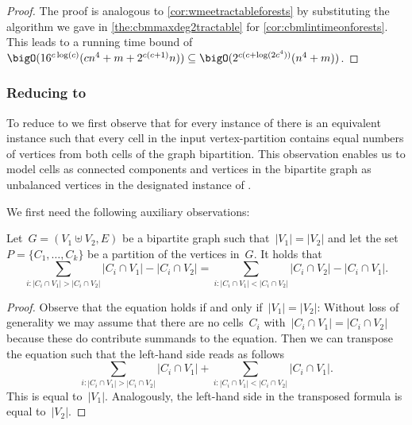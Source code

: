 \begin{proof}
  The proof is analogous to \autoref{cor:wmeetractableforests} by substituting the algorithm we gave in \autoref{the:cbmmaxdeg2tractable} for \autoref{cor:cbmlintimeonforests}. This leads to a running time bound of~$\bigO(16^{c\log(c)}(cn^4+m + 2^{c(c+1)}n)) \subseteq \bigO(2^{c(c + \log(2c^4))}(n^4 + m))$.
\end{proof}

\subsubsection{Reducing \pCBMs{} to \pWMEEAs{}}
To reduce \pCBMs{} to \pWMEEAs{} we first observe that for every instance of \pCBMs{} there is an equivalent instance such that every cell in the input vertex-partition contains equal numbers of vertices from both cells of the graph bipartition. This observation enables us to model cells as connected components and vertices in the bipartite graph as unbalanced vertices in the designated instance of \pWMEEAs{}.

We first need the following auxiliary observations: 
\begin{observation}\label{obs:surplussum}
  Let~$G = (V_1 \uplus V_2, E)$ be a bipartite graph such that~$|V_1| = |V_2|$ and let the set~$P = \{C_1, \ldots, C_k\}$ be a partition of the vertices in~$G$. It holds that \[{\sum_{i: |C_i \cap V_1| > |C_i \cap V_2|}} |C_i \cap V_1| - |C_i \cap V_2| = {\sum_{i: |C_i \cap V_1| < |C_i \cap V_2|}}|C_i \cap V_2| - |C_i \cap V_1| \text{.} \]
\end{observation}
\begin{proof}
  Observe that the equation holds if and only if~$|V_1| = |V_2|$: Without loss of generality we may assume that there are no cells~$C_i$ with~$|C_i \cap V_1| = |C_i \cap V_2|$ because these do contribute summands to the equation. Then we can transpose the equation such that the left-hand side reads as follows \[{\sum_{i: |C_i \cap V_1| > |C_i \cap V_2|}} |C_i \cap V_1| + {\sum_{i: |C_i \cap V_1| < |C_i \cap V_2|}}|C_i \cap V_1|\text{.}\]
This is equal to~$|V_1|$. Analogously, the left-hand side in the transposed formula is equal to~$|V_2|$.
\end{proof}

